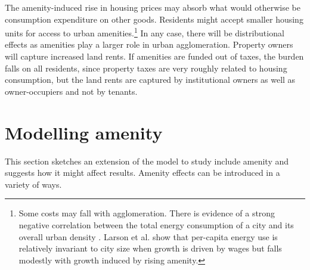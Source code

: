 The amenity-induced rise in housing prices may absorb what would otherwise be consumption expenditure on other goods. Residents might accept smaller housing units for access to urban amenities.\footnote{Some costs may fall with agglomeration. There is evidence of a strong negative correlation between the total energy consumption of a city and its overall urban density \cite{newmanSustainabilityCitiesOvercoming1999}. Larson et al. \cite{larsonEnergyImplicationsCity2015} show that per-capita energy use is relatively invariant to city size when growth is driven by wages but falls modestly with growth induced by rising amenity.} In any case, there will be distributional effects as amenities play a larger role in urban agglomeration. Property owners will capture increased land rents. If amenities are funded out of taxes, the burden falls on all residents, since property taxes are very roughly related to housing consumption, but the land rents are captured by institutional owners as well as owner-occupiers and not by tenants.



 
\section{Modelling amenity}

This section sketches an extension of the model to study include \gls{amenity} and suggests how it might affect results. Amenity effects can be introduced in a variety of ways. %

